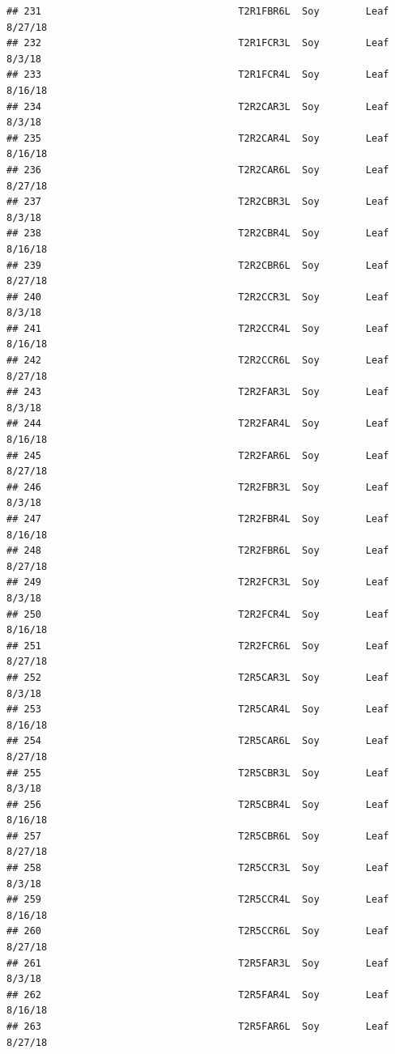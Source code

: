 \documentclass[
]{article}
\begin{document}
\begin{verbatim}
## 231                                  T2R1FBR6L  Soy        Leaf     8/27/18
## 232                                  T2R1FCR3L  Soy        Leaf      8/3/18
## 233                                  T2R1FCR4L  Soy        Leaf     8/16/18
## 234                                  T2R2CAR3L  Soy        Leaf      8/3/18
## 235                                  T2R2CAR4L  Soy        Leaf     8/16/18
## 236                                  T2R2CAR6L  Soy        Leaf     8/27/18
## 237                                  T2R2CBR3L  Soy        Leaf      8/3/18
## 238                                  T2R2CBR4L  Soy        Leaf     8/16/18
## 239                                  T2R2CBR6L  Soy        Leaf     8/27/18
## 240                                  T2R2CCR3L  Soy        Leaf      8/3/18
## 241                                  T2R2CCR4L  Soy        Leaf     8/16/18
## 242                                  T2R2CCR6L  Soy        Leaf     8/27/18
## 243                                  T2R2FAR3L  Soy        Leaf      8/3/18
## 244                                  T2R2FAR4L  Soy        Leaf     8/16/18
## 245                                  T2R2FAR6L  Soy        Leaf     8/27/18
## 246                                  T2R2FBR3L  Soy        Leaf      8/3/18
## 247                                  T2R2FBR4L  Soy        Leaf     8/16/18
## 248                                  T2R2FBR6L  Soy        Leaf     8/27/18
## 249                                  T2R2FCR3L  Soy        Leaf      8/3/18
## 250                                  T2R2FCR4L  Soy        Leaf     8/16/18
## 251                                  T2R2FCR6L  Soy        Leaf     8/27/18
## 252                                  T2R5CAR3L  Soy        Leaf      8/3/18
## 253                                  T2R5CAR4L  Soy        Leaf     8/16/18
## 254                                  T2R5CAR6L  Soy        Leaf     8/27/18
## 255                                  T2R5CBR3L  Soy        Leaf      8/3/18
## 256                                  T2R5CBR4L  Soy        Leaf     8/16/18
## 257                                  T2R5CBR6L  Soy        Leaf     8/27/18
## 258                                  T2R5CCR3L  Soy        Leaf      8/3/18
## 259                                  T2R5CCR4L  Soy        Leaf     8/16/18
## 260                                  T2R5CCR6L  Soy        Leaf     8/27/18
## 261                                  T2R5FAR3L  Soy        Leaf      8/3/18
## 262                                  T2R5FAR4L  Soy        Leaf     8/16/18
## 263                                  T2R5FAR6L  Soy        Leaf     8/27/18

\end{verbatim}
\end{document}

